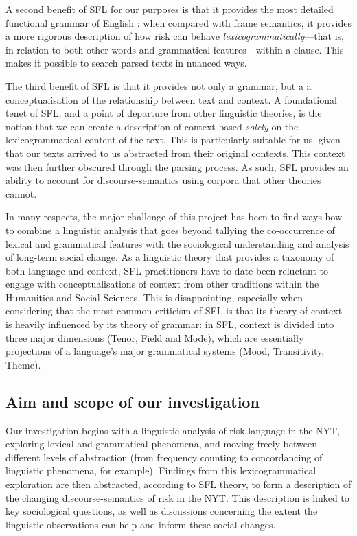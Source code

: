 A second benefit of SFL for our purposes is that it provides the most detailed functional grammar of English \cite{eggins_analysing:_2004}: when compared with frame semantics, it provides a more rigorous description of how risk can behave \emph{lexicogrammatically}---that is, in relation to both other words and grammatical features---within a clause. This makes it possible to search parsed texts in nuanced ways.

The third benefit of SFL is that it provides not only a grammar, but a a conceptualisation of the relationship between text and context. A foundational tenet of SFL, and a point of departure from other linguistic theories, is the notion that we can create a description of context based \emph{solely} on the lexicogrammatical content of the text. This is particularly suitable for us, given that our texts arrived to us abstracted from their original contexts. This context was then further obscured through the parsing process. As such, SFL provides an ability to account for discourse-semantics using corpora that other theories cannot.

In many respects, the major challenge of this project has been to find ways how to combine a linguistic analysis that goes beyond tallying the co-occurrence of lexical and grammatical features with the sociological understanding and analysis of long-term social change. As a linguistic theory that provides a taxonomy of both language and context, SFL practitioners have to date been reluctant to engage with conceptualisations of context from other traditions within the Humanities and Social Sciences. This is disappointing, especially when considering that the most common criticism of SFL is that its theory of context is heavily influenced by its theory of grammar: in SFL, context is divided into three major dimensions (Tenor, Field and Mode), which are essentially projections of a language's major grammatical systems (Mood, Transitivity, Theme).


\subsection{Aim and scope of our investigation}

Our investigation begins with a linguistic analysis of risk language in the NYT, exploring lexical and grammatical phenomena, and moving freely between different levels of abstraction (from frequency counting to concordancing of linguistic phenomena, for example). Findings from this lexicogrammatical exploration are then abstracted, according to SFL theory, to form a description of the changing discourse-semantics of risk in the NYT. This description is linked to key sociological questions, as well as discussions concerning the extent the linguistic observations can help and inform these social changes. 

